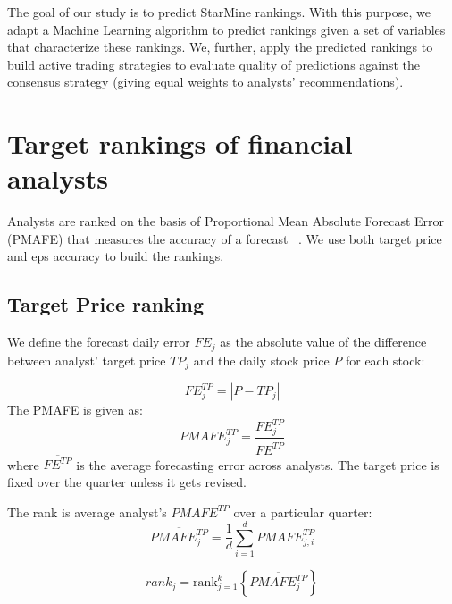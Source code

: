 \documentclass[a4paper,twoside,12pt,openright,notitlepage]{report}\usepackage[]{graphicx}\usepackage[]{color}
\begin{document}
The goal of our study is to predict  StarMine rankings. With this purpose, we adapt a Machine Learning  algorithm to predict rankings  given a set of variables that characterize these rankings. We, further, apply the predicted rankings  to build active trading strategies to evaluate quality of predictions against the consensus strategy (giving equal weights to analysts' recommendations).






\section{Target rankings of financial analysts}
\label{ch4:sec-tr}
 Analysts are ranked on the basis of Proportional Mean Absolute Forecast Error (PMAFE) that measures the accuracy of a forecast ~\citep{clement1999,brown2001,ertimur2007}. We use both target price and \gls{eps} accuracy to build the rankings.

\subsection{Target Price ranking}
\label{ch4:rank}
 We define the forecast daily error  $FE_{j}$ as the absolute value of the difference between analyst' target price $TP_{j}$ and the daily stock price $P$ for each stock:

\begin{equation}
	\label{ch4-dfe}
	FE_{j}^{TP}=|{P-TP_{j}}|
\end{equation}
The PMAFE is given as:
\begin{equation}
	\label{ch4-tp:pmafe}
	PMAFE_{j}^{TP}=\frac{FE_{j}^{TP}}{\overline{FE^{TP}}}
\end{equation}
where $\overline{{FE}^{TP}}$ is the average forecasting error across analysts. The target price is fixed over the quarter unless it gets revised.

The rank is average analyst's $PMAFE^{TP}$ over a particular quarter:
\begin{equation}
	\overline{PMAFE_{j}^{TP}}=\frac{1}{d} \sum_{i=1}^{d} PMAFE_{j,i}^{TP}
\end{equation}

\begin{equation}
	\label{ch4-tp:rank}
	rank_{j}=\mathrm{rank}_{j=1}^{k} \left\{ \overline{PMAFE_{j}^{TP}} \right\}
\end{equation}
\end{document}
